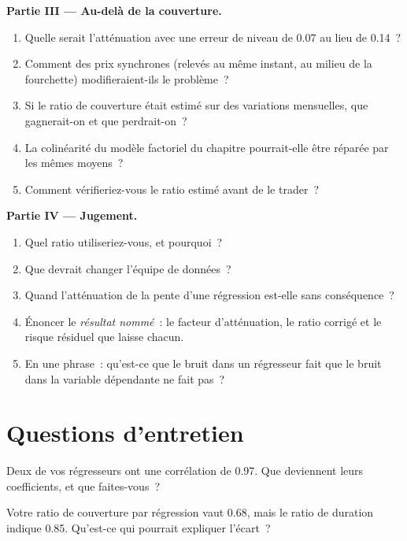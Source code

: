 \begin{problem}
\medskip\noindent\textbf{Partie III --- Au-delà de la couverture.}
\begin{enumerate}[resume]
\item Quelle serait l'atténuation avec une erreur de niveau de 0.07 au lieu de 0.14~?
\item Comment des prix synchrones (relevés au même instant, au milieu de la fourchette) modifieraient-ils le problème~?
\item Si le ratio de couverture était estimé sur des variations mensuelles, que gagnerait-on et que perdrait-on~?
\item La colinéarité du modèle factoriel du chapitre pourrait-elle être réparée par les mêmes moyens~?
\item Comment vérifieriez-vous le ratio estimé avant de le trader~?
\end{enumerate}

\medskip\noindent\textbf{Partie IV --- Jugement.}
\begin{enumerate}[resume]
\item Quel ratio utiliseriez-vous, et pourquoi~?
\item Que devrait changer l'équipe de données~?
\item Quand l'atténuation de la pente d'une régression est-elle sans conséquence~?
\item Énoncer le \emph{résultat nommé}~: le facteur d'atténuation, le ratio corrigé et le risque résiduel que laisse chacun.
\item En une phrase~: qu'est-ce que le bruit dans un régresseur fait que le bruit dans la variable dépendante ne fait pas~?
\end{enumerate}
\end{problem}

\section{Questions d'entretien}

\begin{interviewq}\label{iq:qm:linear-models-under-stress:1}
Deux de vos régresseurs ont une corrélation de 0.97. Que deviennent leurs coefficients, et que faites-vous~?
\end{interviewq}

\begin{interviewq}\label{iq:qm:linear-models-under-stress:2}
Votre ratio de couverture par régression vaut 0.68, mais le ratio de duration indique 0.85. Qu'est-ce qui pourrait expliquer l'écart~?
\end{interviewq}

